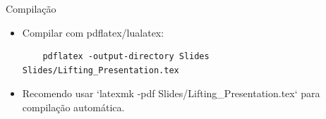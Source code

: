 \documentclass{beamer}
\begin{document}
\begin{frame}{Compilação}
  \begin{itemize}
    \item Compilar com pdflatex/lualatex:
    \begin{verbatim}
    pdflatex -output-directory Slides Slides/Lifting_Presentation.tex
    \end{verbatim}
    \item Recomendo usar `latexmk -pdf Slides/Lifting_Presentation.tex` para compilação automática.
  \end{itemize}
\end{frame}
\end{document}
